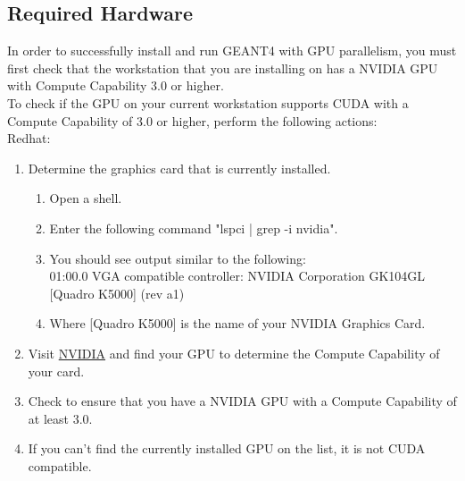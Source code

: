 \documentclass[12pt]{article}
\begin{document}
\subsection{Required Hardware} %
In order to successfully install and run GEANT4 with GPU parallelism, you must first check that the workstation that you are installing on has a NVIDIA GPU with Compute Capability 3.0 or higher.\\
To check if the GPU on your current workstation supports CUDA with a Compute Capability of 3.0 or higher, perform the following actions:\\

Redhat:
\begin{enumerate}
\item Determine the graphics card that is currently installed.
\begin{enumerate}
\item Open a shell.
\item Enter the following command "lspci | grep -i nvidia".
\item You should see output similar to the following:\\
01:00.0 VGA compatible controller: NVIDIA Corporation GK104GL [Quadro K5000] (rev a1)
\item Where [Quadro K5000] is the name of your NVIDIA Graphics Card.
\end{enumerate}
\item Visit \href{https://developer.nvidia.com/cuda-gpus}{NVIDIA} and find your GPU to determine the Compute Capability of your card.
\item Check to ensure that you have a NVIDIA GPU with a  Compute Capability of at least 3.0.
\item If you can't find the currently installed GPU on the list, it is not CUDA compatible.
\end{enumerate}
\end{document}
